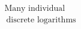 \documentclass[preview]{standalone}
\begin{document}
\begin{align*}
\text{Many individual} \\\ \text{discrete logarithms}
\end{align*}
\end{document}
